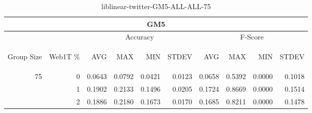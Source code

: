 \begin{center}
\begin{table}[htbp]
\begin{tabular}{ | r | r | r | r | r | r | r | r | r | r |}
\hline
\multicolumn{10}{|c|}{GM5}\\
\hline
 & & \multicolumn{4}{|c|}{Accuracy} & \multicolumn{4}{|c|}{F-Score}\\ \cline{3-10}
\begin{sideways}Group Size\end{sideways} & \begin{sideways}Web1T \%\end{sideways} & \begin{sideways}AVG\end{sideways} & \begin{sideways}MAX\end{sideways} & \begin{sideways}MIN\end{sideways} & \begin{sideways}STDEV\end{sideways} & \begin{sideways}AVG\end{sideways} & \begin{sideways}MAX\end{sideways} & \begin{sideways}MIN\end{sideways} & \begin{sideways}STDEV\end{sideways}\\
\hline
\multirow{3}{*}{75}
 & 0 & 0.0643 & 0.0792 & 0.0421 & 0.0123 & 0.0658 & 0.5392 & 0.0000 & 0.1018\\ \cline{2-10}
 & 1 & 0.1902 & 0.2133 & 0.1496 & 0.0205 & 0.1724 & 0.8669 & 0.0000 & 0.1514\\ \cline{2-10}
 & 2 & 0.1886 & 0.2180 & 0.1673 & 0.0170 & 0.1685 & 0.8211 & 0.0000 & 0.1478\\ \cline{2-10}
\hline
\end{tabular}
\caption{liblinear-twitter-GM5-ALL-ALL-75}
\end{table}
\end{center}


